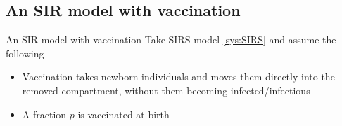 \documentclass[aspectratio=43]{beamer}
\begin{document}
\subsection{An SIR model with vaccination}

\begin{frame}{An SIR model with vaccination}
Take SIRS model \eqref{sys:SIRS} and assume the following
\begin{itemize}
\item Vaccination takes newborn individuals and moves them directly into the removed compartment, without them becoming infected/infectious
\item A fraction $p$ is vaccinated at birth
\end{itemize}
\end{frame}
\end{document}
